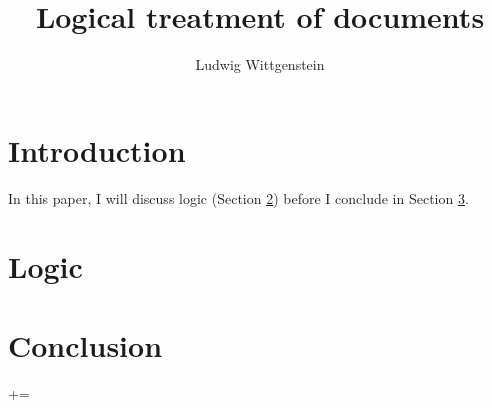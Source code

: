 \documentclass{scrartcl}
\title{Logical treatment of documents}
\author{Ludwig Wittgenstein}
\begin{document}
\maketitle


\section{Introduction}
In this paper, I will discuss logic (Section \ref{sec:logic}) before I conclude in Section \ref{sec:conclusion}.

\section{Logic}\label{sec:logic}

\section{Conclusion}\label{sec:conclusion}

\textonehalf+\textonequarter=\textthreequarters
\end{document}
